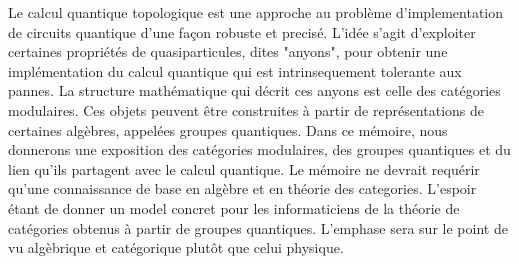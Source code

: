 Le calcul quantique topologique est une approche au probl\`eme d'implementation
de circuits quantique d'une fa\c{c}on robuste et precis\'e.  L'id\'ee s'agit
d'exploiter certaines propri\'et\'es de quasiparticules, dites "anyons", pour
obtenir une impl\'ementation du calcul quantique qui est intrinsequement
tolerante aux pannes. La structure math\'ematique qui d\'ecrit ces anyons est celle
des cat\'egories modulaires.  Ces objets peuvent \^etre construites \`a partir de
repr\'esentations de certaines alg\`ebres, appel\'ees groupes quantiques.  Dans ce
m\'emoire, nous donnerons une exposition des cat\'egories modulaires, des groupes
quantiques et du lien qu'ils partagent avec le calcul quantique. Le m\'emoire ne
devrait requ\'erir qu'une connaissance de base en alg\`ebre et en th\'eorie des
categories. L'espoir \'etant de donner un model concret pour les informaticiens
de la th\'eorie de cat\'egories obtenus \`a partir de groupes quantiques.  L'emphase
sera sur le point de vu alg\`ebrique et cat\'egorique plut\^ot que celui physique.
